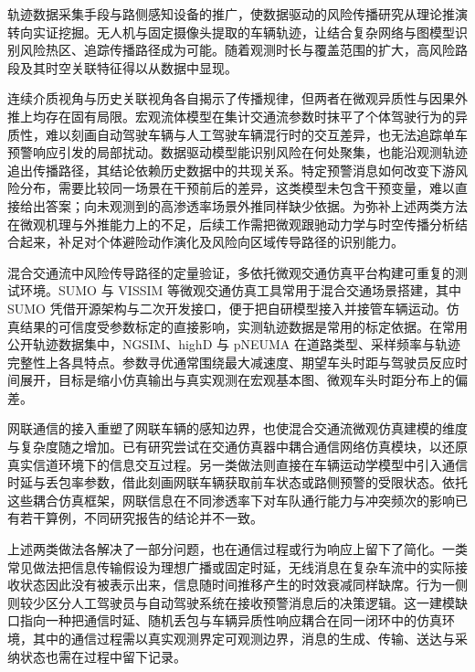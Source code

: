 \documentclass[oneside,doctype=proposal,fontset=windows,times=true]{tongjithesis}
\begin{document}
\begin{tjformbody}
轨迹数据采集手段与路侧感知设备的推广，使数据驱动的风险传播研究从理论推演转向实证挖掘。无人机与固定摄像头提取的车辆轨迹，让结合复杂网络与图模型识别风险热区、追踪传播路径成为可能\cite{saberi2020}\cite{duan2023}。随着观测时长与覆盖范围的扩大，高风险路段及其时空关联特征得以从数据中显现\cite{hamedmoghadam2021}。

连续介质视角与历史关联视角各自揭示了传播规律，但两者在微观异质性与因果外推上均存在固有局限。宏观流体模型在集计交通流参数时抹平了个体驾驶行为的异质性，难以刻画自动驾驶车辆与人工驾驶车辆混行时的交互差异，也无法追踪单车预警响应引发的局部扰动。数据驱动模型能识别风险在何处聚集，也能沿观测轨迹追出传播路径，其结论依赖历史数据中的共现关系。特定预警消息如何改变下游风险分布，需要比较同一场景在干预前后的差异，这类模型未包含干预变量，难以直接给出答案；向未观测到的高渗透率场景外推同样缺少依据。为弥补上述两类方法在微观机理与外推能力上的不足，后续工作需把微观跟驰动力学与时空传播分析结合起来，补足对个体避险动作演化及风险向区域传导路径的识别能力。

%
混合交通流中风险传导路径的定量验证，多依托微观交通仿真平台构建可重复的测试环境。SUMO 与 VISSIM 等微观交通仿真工具常用于混合交通场景搭建，其中 SUMO 凭借开源架构与二次开发接口，便于把自研模型接入并接管车辆运动\cite{sumo2010}。仿真结果的可信度受参数标定的直接影响，实测轨迹数据是常用的标定依据。在常用公开轨迹数据集中，NGSIM、highD 与 pNEUMA 在道路类型、采样频率与轨迹完整性上各具特点\cite{coifman2017}\cite{barmpounakis2020}。参数寻优通常围绕最大减速度、期望车头时距与驾驶员反应时间展开，目标是缩小仿真输出与真实观测在宏观基本图、微观车头时距分布上的偏差\cite{cunto2008}。

网联通信的接入重塑了网联车辆的感知边界，也使混合交通流微观仿真建模的维度与复杂度随之增加。已有研究尝试在交通仿真器中耦合通信网络仿真模块，以还原真实信道环境下的信息交互过程。另一类做法则直接在车辆运动学模型中引入通信时延与丢包率参数，借此刻画网联车辆获取前车状态或路侧预警的受限状态\cite{orosz2016}。依托这些耦合仿真框架，网联信息在不同渗透率下对车队通行能力与冲突频次的影响已有若干算例，不同研究报告的结论并不一致。

上述两类做法各解决了一部分问题，也在通信过程或行为响应上留下了简化。一类常见做法把信息传输假设为理想广播或固定时延，无线消息在复杂车流中的实际接收状态因此没有被表示出来，信息随时间推移产生的时效衰减同样缺席。行为一侧则较少区分人工驾驶员与自动驾驶系统在接收预警消息后的决策逻辑。这一建模缺口指向一种把通信时延、随机丢包与车辆异质性响应耦合在同一闭环中的仿真环境，其中的通信过程需以真实观测界定可观测边界，消息的生成、传输、送达与采纳状态也需在过程中留下记录。


\end{tjformbody}
\end{document}
